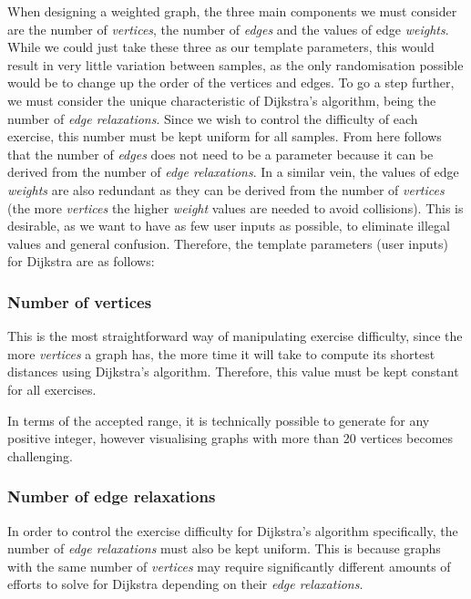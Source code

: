 \documentclass{l4proj}
\begin{document}
When designing a weighted graph, the three main components we must consider are the number of \emph{vertices}, the number of \emph{edges} and the values of edge \emph{weights}. While we could just take these three as our template parameters, this would result in very little variation between samples, as the only randomisation possible would be to change up the order of the vertices and edges. To go a step further, we must consider the unique characteristic of Dijkstra's algorithm, being the number of \emph{edge relaxations}. Since we wish to control the difficulty of each exercise, this number must be kept uniform for all samples. From here follows that the number of \emph{edges} does not need to be a parameter because it can be derived from the number of \emph{edge relaxations}. In a similar vein, the values of edge \emph{weights} are also redundant as they can be derived from the number of \emph{vertices} (the more \emph{vertices} the higher \emph{weight} values are needed to avoid collisions). This is desirable, as we want to have as few user inputs as possible, to eliminate illegal values and general confusion. Therefore, the template parameters (user inputs) for Dijkstra are as follows:

\subsubsection{Number of vertices}

This is the most straightforward way of manipulating exercise difficulty, since the more \emph{vertices} a graph has, the more time it will take to compute its shortest distances using Dijkstra's algorithm. Therefore, this value must be kept constant for all exercises. 

In terms of the accepted range, it is technically possible to generate for any positive integer, however visualising graphs with more than 20 vertices becomes challenging.

\subsubsection{Number of edge relaxations}

In order to control the exercise difficulty for Dijkstra's algorithm specifically, the number of \emph{edge relaxations} must also be kept uniform. This is because graphs with the same number of \emph{vertices} may require significantly different amounts of efforts to solve for Dijkstra depending on their \emph{edge relaxations}. 
\end{document}
